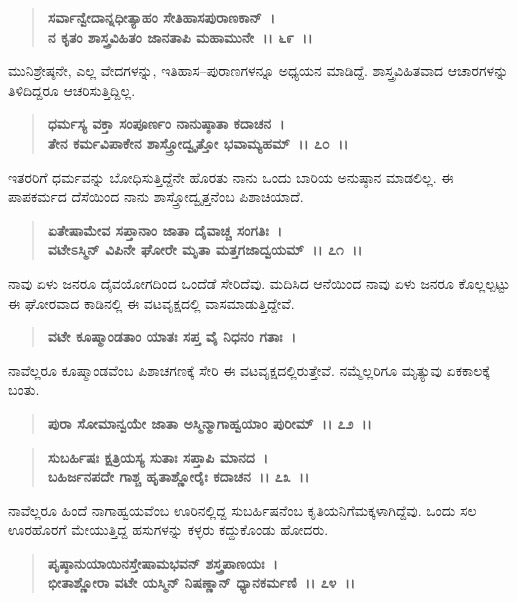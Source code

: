 \begin{verse}
\textbf{ಸರ್ವಾನ್ವೇದಾನ್ನಧೀತ್ಯಾಹಂ ಸೇತಿಹಾಸಪುರಾಣಕಾನ್~।}\\\textbf{ನ ಕೃತಂ ಶಾಸ್ತ್ರವಿಹಿತಂ ಜಾನತಾಪಿ ಮಹಾಮುನೇ~।। ೬೯~।।}
\end{verse}

ಮುನಿಶ್ರೇಷ್ಠನೇ, ಎಲ್ಲ ವೇದಗಳನ್ನು, ಇತಿಹಾಸ–ಪುರಾಣಗಳನ್ನೂ ಅಧ್ಯಯನ ಮಾಡಿದ್ದೆ. ಶಾಸ್ತ್ರವಿಹಿತವಾದ ಆಚಾರಗಳನ್ನು ತಿಳಿದಿದ್ದರೂ ಆಚರಿಸುತ್ತಿದ್ದಿಲ್ಲ.

\begin{verse}
\textbf{ಧರ್ಮಸ್ಯ ವಕ್ತಾ ಸಂಪೂರ್ಣಂ ನಾನುಷ್ಠಾತಾ ಕದಾಚನ~।}\\\textbf{ತೇನ ಕರ್ಮವಿಪಾಕೇನ ಶಾಸ್ತ್ರೋದ್ವೃತ್ತೋ ಭವಾಮ್ಯಹಮ್~।। ೭೦~।।}
\end{verse}

ಇತರರಿಗೆ ಧರ್ಮವನ್ನು ಬೋಧಿಸುತ್ತಿದ್ದೆನೇ ಹೊರತು ನಾನು ಒಂದು ಬಾರಿಯ ಅನುಷ್ಠಾನ ಮಾಡಲಿಲ್ಲ. ಈ ಪಾಪಕರ್ಮದ ದೆಸೆಯಿಂದ ನಾನು ಶಾಸ್ತ್ರೋದ್ವೃತ್ತನೆಂಬ ಪಿಶಾಚಿಯಾದೆ.

\begin{verse}
\textbf{ಏತೇಷಾಮೇವ ಸಪ್ತಾನಾಂ ಜಾತಾ ದೈವಾಚ್ಚ ಸಂಗತಿಃ~।}\\\textbf{ವಟೇಽಸ್ಮಿನ್ ವಿಪಿನೇ ಘೋರೇ ಮೃತಾ ಮತ್ತಗಜಾದ್ವಯಮ್~।। ೭೧~।।}
\end{verse}

ನಾವು ಏಳು ಜನರೂ ದೈವಯೋಗದಿಂದ ಒಂದೆಡೆ ಸೇರಿದೆವು. ಮದಿಸಿದ ಆನೆಯಿಂದ ನಾವು ಏಳು ಜನರೂ ಕೊಲ್ಲಲ್ಪಟ್ಟು ಈ ಘೋರವಾದ ಕಾಡಿನಲ್ಲಿ ಈ ವಟವೃಕ್ಷದಲ್ಲಿ ವಾಸಮಾಡುತ್ತಿದ್ದೇವೆ.

\begin{verse}
\textbf{ವಟೇ ಕೂಷ್ಮಾಂಡತಾಂ ಯಾತಃ ಸಪ್ತ ವೈ ನಿಧನಂ ಗತಾಃ~।}
\end{verse}

ನಾವೆಲ್ಲರೂ ಕೂಷ್ಮಾಂಡವೆಂಬ ಪಿಶಾಚಗಣಕ್ಕೆ ಸೇರಿ ಈ ವಟವೃಕ್ಷದಲ್ಲಿರುತ್ತೇವೆ. ನಮ್ಮೆಲ್ಲರಿಗೂ ಮೃತ್ಯುವು ಏಕಕಾಲಕ್ಕೆ ಬಂತು.

\begin{verse}
\textbf{ಪುರಾ ಸೋಮಾನ್ವಯೇ ಜಾತಾ ಅಸ್ಮಿನ್ಮಾಗಾಹ್ವಯಾಂ ಪುರೀಮ್~।। ೭೨~।।} 
\end{verse}

\begin{verse}
\textbf{ಸುಬರ್ಹಿಷಃ ಕ್ಷತ್ರಿಯಸ್ಯ ಸುತಾಃ ಸಪ್ತಾಪಿ ಮಾನದ~।}\\\textbf{ಬಹಿರ್ಜನಪದೇ ಗಾಶ್ಚ ಹೃತಾಶ್ಣೋರೈಃ ಕದಾಚನ~।। ೭೩~।।}
\end{verse}

ನಾವೆಲ್ಲರೂ ಹಿಂದೆ ನಾಗಾಹ್ವಯವೆಂಬ ಊರಿನಲ್ಲಿದ್ದ ಸುಬರ್ಹಿಷನೆಂಬ ಕೃತಿಯನಿಗೆ\break ಮಕ್ಕಳಾಗಿದ್ದೆವು. ಒಂದು ಸಲ ಊರಹೊರಗೆ ಮೇಯುತ್ತಿದ್ದ ಹಸುಗಳನ್ನು ಕಳ್ಳರು ಕದ್ದುಕೊಂಡು ಹೋದರು.

\begin{verse}
\textbf{ಪೃಷ್ಠಾನುಯಾಯಿನಸ್ತೇಷಾಮಭವನ್ ಶಸ್ತ್ರಪಾಣಯಃ~।}\\\textbf{ಭೀತಾಶ್ಣೋರಾ ವಟೇ ಯಸ್ಮಿನ್ ನಿಷಣ್ಣಾನ್ ಧ್ಯಾನಕರ್ಮಣಿ~।। ೭೪~।।}
\end{verse}

